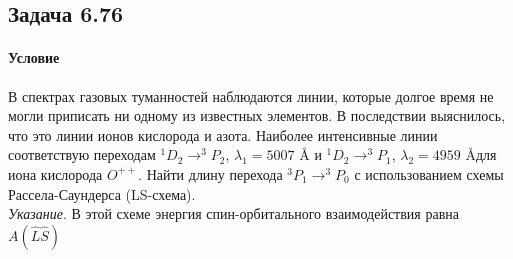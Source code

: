 \documentclass[12pt]{article}
\begin{document}
\subsection{Задача 6.76}
\label{task_6.76}
\paragraph{Условие}
В спектрах газовых туманностей наблюдаются линии, которые долгое время не могли приписать ни одному из известных элементов. В последствии выяснилось, что это линии ионов кислорода и азота. Наиболее интенсивные линии соответствую переходам $^1D_2 \rightarrow ^3P_2$, $\lambda_1 = 5007$ \AA\text{ } и $^1D_2 \rightarrow ^3P_1$, $\lambda_2 = 4959$ \AA\text{ }для иона кислорода $O^{++}$. Найти длину перехода $^3P_1 \rightarrow ^3P_0$ с использованием схемы Рассела-Саундерса (LS-схема).\\
\textit{Указание}. В этой схеме энергия спин-орбитального взаимодействия равна $A( \hat{L}\hat{S} )$
\end{document}

